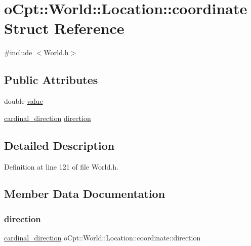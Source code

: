 \hypertarget{structo_cpt_1_1_world_1_1_location_1_1coordinate}{}\section{o\+Cpt\+:\+:World\+:\+:Location\+:\+:coordinate Struct Reference}
\label{structo_cpt_1_1_world_1_1_location_1_1coordinate}


{\ttfamily \#include $<$World.\+h$>$}

\subsection*{Public Attributes}
\begin{DoxyCompactItemize}
\item 
double \hyperlink{structo_cpt_1_1_world_1_1_location_1_1coordinate_adc08e8df0bc1335c3e82ba22c20e5f2a}{value}
\item 
\hyperlink{classo_cpt_1_1_world_1_1_location_aa37d99a87b49ccc38470dcc6cc64ced5}{cardinal\+\_\+direction} \hyperlink{structo_cpt_1_1_world_1_1_location_1_1coordinate_ad26574b6dd132610ed3383d52a4fe95f}{direction}
\end{DoxyCompactItemize}


\subsection{Detailed Description}


Definition at line 121 of file World.\+h.



\subsection{Member Data Documentation}
\hypertarget{structo_cpt_1_1_world_1_1_location_1_1coordinate_ad26574b6dd132610ed3383d52a4fe95f}{}\label{structo_cpt_1_1_world_1_1_location_1_1coordinate_ad26574b6dd132610ed3383d52a4fe95f} 
\subsubsection{\texorpdfstring{direction}{direction}}
{\footnotesize\ttfamily \hyperlink{classo_cpt_1_1_world_1_1_location_aa37d99a87b49ccc38470dcc6cc64ced5}{cardinal\+\_\+direction} o\+Cpt\+::\+World\+::\+Location\+::coordinate\+::direction}



